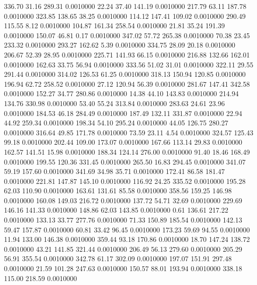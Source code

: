 336.70   31.16  289.31   0.0010000
  22.24   37.40  141.19   0.0010000
 217.79   63.11  187.78   0.0010000
 323.85  138.65   38.25   0.0010000
 114.12  147.41  109.02   0.0010000
 290.49  115.55    8.12   0.0010000
 104.87  161.34  258.54   0.0010000
  21.81   35.24  191.39   0.0010000
 150.07   46.81    0.17   0.0010000
 347.02   57.72  265.38   0.0010000
  70.38   23.45  233.32   0.0010000
 293.27  162.62    5.39   0.0010000
 334.75   28.09   20.18   0.0010000
 206.67   52.39   28.95   0.0010000
 225.71  141.93   66.15   0.0010000
 216.88  132.66  162.01   0.0010000
 162.63   33.75   56.94   0.0010000
 333.56   51.02   31.01   0.0010000
 322.11   29.55  291.44   0.0010000
 314.02  126.53   61.25   0.0010000
 318.13  150.94  120.85   0.0010000
 196.94   62.72  258.52   0.0010000
  27.12  120.94   56.39   0.0010000
 281.67  147.41  342.58   0.0010000
 152.27   34.77  280.86   0.0010000
  14.38   44.10  143.83   0.0010000
 214.94  134.76  330.98   0.0010000
  53.40   55.24  313.84   0.0010000
 283.63   24.61   23.96   0.0010000
 184.53   46.18  284.49   0.0010000
 187.49  132.11  331.87   0.0010000
  22.94   44.92  259.34   0.0010000
 198.34   54.10  295.24   0.0010000
  44.05  126.75  280.27   0.0010000
 316.64   49.85  171.78   0.0010000
  73.59   23.11    4.54   0.0010000
 324.57  125.43   99.18   0.0010000
 202.44  109.00  173.07   0.0010000
 167.66  113.14   29.83   0.0010000
 162.57  141.51   15.98   0.0010000
 188.34  124.14  276.00   0.0010000
  91.40   18.46  168.49   0.0010000
 199.55  120.36  331.45   0.0010000
 265.50   16.83  294.45   0.0010000
 341.07   59.19  157.60   0.0010000
 341.69   34.98   35.71   0.0010000
 172.41   86.58  181.47   0.0010000
 221.81  147.87  145.10   0.0010000
 116.92   24.25  335.52   0.0010000
 195.28   62.03  110.90   0.0010000
 163.61  131.61   85.58   0.0010000
 358.56  159.25  146.98   0.0010000
 160.08  149.03  216.72   0.0010000
 137.72   54.71   32.69   0.0010000
 229.69  146.16  141.33   0.0010000
 148.86   62.03  143.85   0.0010000
   0.61  136.61  217.22   0.0010000
 133.13   33.77  277.76   0.0010000
  71.33  150.89  185.54   0.0010000
 142.13   59.47  157.87   0.0010000
  60.81   33.42   96.45   0.0010000
 173.23   59.69   94.55   0.0010000
  11.94  133.00  146.38   0.0010000
 359.44   93.18  170.86   0.0010000
  18.70  147.24  138.72   0.0010000
  43.21  141.85  321.44   0.0010000
 206.49   56.13  279.60   0.0010000
 205.29   56.91  355.54   0.0010000
 342.78   61.17  302.09   0.0010000
 197.07  151.91  297.48   0.0010000
  21.59  101.28  247.63   0.0010000
 150.57   88.01  193.94   0.0010000
 338.18  115.00  218.59   0.0010000
